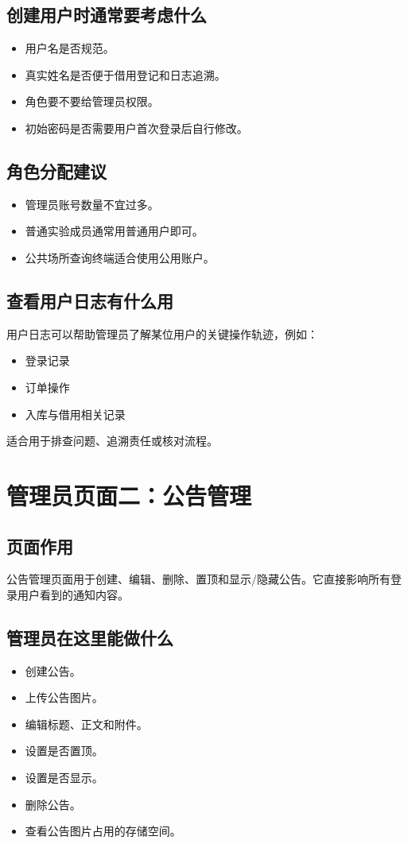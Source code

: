 \documentclass[12pt,a4paper]{ctexart}
\begin{document}
\subsection{创建用户时通常要考虑什么}
\begin{itemize}
  \item 用户名是否规范。
  \item 真实姓名是否便于借用登记和日志追溯。
  \item 角色要不要给管理员权限。
  \item 初始密码是否需要用户首次登录后自行修改。
\end{itemize}

\subsection{角色分配建议}
\begin{itemize}
  \item 管理员账号数量不宜过多。
  \item 普通实验成员通常用普通用户即可。
  \item 公共场所查询终端适合使用公用账户。
\end{itemize}

\subsection{查看用户日志有什么用}
用户日志可以帮助管理员了解某位用户的关键操作轨迹，例如：
\begin{itemize}
  \item 登录记录
  \item 订单操作
  \item 入库与借用相关记录
\end{itemize}

适合用于排查问题、追溯责任或核对流程。

\newpage
\section{管理员页面二：公告管理}

\subsection{页面作用}
公告管理页面用于创建、编辑、删除、置顶和显示/隐藏公告。它直接影响所有登录用户看到的通知内容。

\subsection{管理员在这里能做什么}
\begin{itemize}
  \item 创建公告。
  \item 上传公告图片。
  \item 编辑标题、正文和附件。
  \item 设置是否置顶。
  \item 设置是否显示。
  \item 删除公告。
  \item 查看公告图片占用的存储空间。
\end{itemize}
\end{document}
